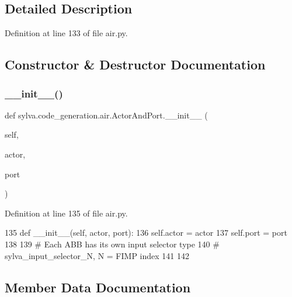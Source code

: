 \subsection{Detailed Description}


Definition at line 133 of file air.\+py.



\subsection{Constructor \& Destructor Documentation}
\mbox{\label{classsylva_1_1code__generation_1_1air_1_1_actor_and_port_ae88892bdf1efb9e78320ff9576f7c576}} 
\subsubsection{\texorpdfstring{\+\_\+\+\_\+init\+\_\+\+\_\+()}{\_\_init\_\_()}}
{\footnotesize\ttfamily def sylva.\+code\+\_\+generation.\+air.\+Actor\+And\+Port.\+\_\+\+\_\+init\+\_\+\+\_\+ (\begin{DoxyParamCaption}\item[{}]{self,  }\item[{}]{actor,  }\item[{}]{port }\end{DoxyParamCaption})}



Definition at line 135 of file air.\+py.


\begin{DoxyCode}
135     \textcolor{keyword}{def }\_\_init\_\_(self, actor, port):
136         self.actor = actor
137         self.port = port
138 
139 \textcolor{comment}{# Each ABB has its own input selector type}
140 \textcolor{comment}{# sylva\_input\_selector\_N, N = FIMP index}
141 
142 
\end{DoxyCode}


\subsection{Member Data Documentation}
\mbox{\label{classsylva_1_1code__generation_1_1air_1_1_actor_and_port_ae75bb4b57c6e2238f8f2fdadbc52311a}} 
